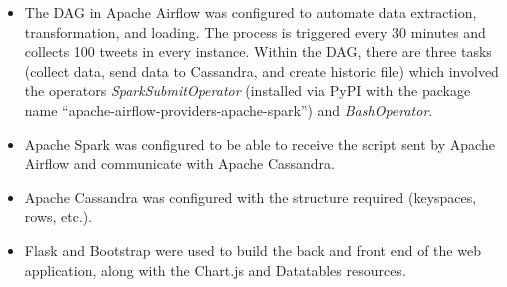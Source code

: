 \begin{itemize}
	\item The DAG in Apache Airflow was configured to automate data extraction, transformation, and loading. The process is triggered every 30 minutes and collects 100 tweets in every instance. Within the DAG, there are three tasks (collect data, send data to Cassandra, and create historic file) which involved the operators \textit{SparkSubmitOperator} (installed via PyPI with the package name ``apache-airflow-providers-apache-spark'') and \textit{BashOperator}.
	\item Apache Spark was configured to be able to receive the script sent by Apache Airflow and communicate with Apache Cassandra.
	\item Apache Cassandra was configured with the structure required (keyspaces, rows, etc.).
	\item Flask and Bootstrap were used to build the back and front end of the web application, along with the Chart.js and Datatables resources.
\end{itemize}

